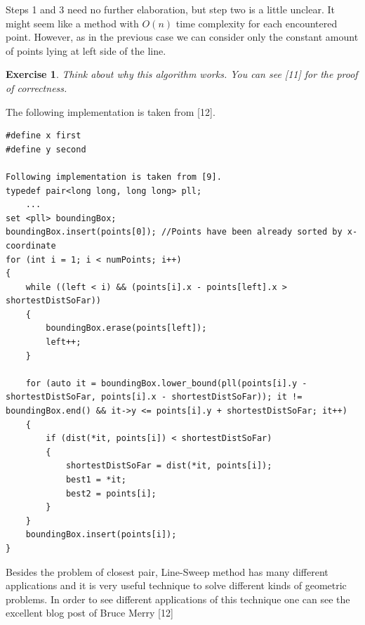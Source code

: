 \documentclass[12pt]{article}
\newtheorem{exercise}{Exercise}[section]
\begin{document}
Steps 1 and 3 need no further elaboration, but step two is a little unclear.
It might seem like a method with $O(n)$ time complexity for each encountered point.
However, as in the previous case we can consider only the constant amount of points
lying at left side of the line.

\begin{exercise}
  Think about why this algorithm works. You can see [11] 
  for the proof of correctness.
\end{exercise}


The following implementation is taken from [12].
\begin{lstlisting}
#define x first
#define y second

Following implementation is taken from [9].
typedef pair<long long, long long> pll;
    ...
set <pll> boundingBox;
boundingBox.insert(points[0]); //Points have been already sorted by x-coordinate
for (int i = 1; i < numPoints; i++)
{
    while ((left < i) && (points[i].x - points[left].x > shortestDistSoFar))
    {
        boundingBox.erase(points[left]);
        left++;
    }

    for (auto it = boundingBox.lower_bound(pll(points[i].y - shortestDistSoFar, points[i].x - shortestDistSoFar)); it != boundingBox.end() && it->y <= points[i].y + shortestDistSoFar; it++)
    {
        if (dist(*it, points[i]) < shortestDistSoFar)
        {
            shortestDistSoFar = dist(*it, points[i]);
            best1 = *it;
            best2 = points[i];
        }
    }
    boundingBox.insert(points[i]);
}
\end{lstlisting}

Besides the problem of closest pair, Line-Sweep method has many different applications and it is very useful technique to solve different kinds of geometric problems. In order to see different applications of this technique one can see the excellent blog post of Bruce Merry [12]
\end{document}
